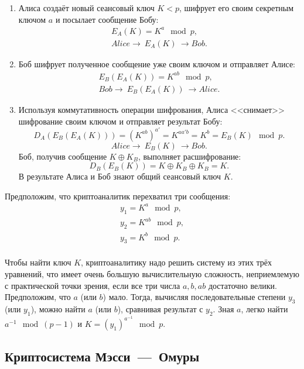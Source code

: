 \begin{enumerate}
    \item Алиса создаёт новый сеансовый ключ $K < p$, шифрует его своим секретным ключом $a$ и посылает сообщение Бобу:
            \[\begin{array}{l}
		E_A(K) = K ^ a \mod p, \\
		Alice \rightarrow ~ E_A(K) ~ \rightarrow Bob.
	    \end{array}\]
    \item Боб шифрует полученное сообщение уже своим ключом и отправляет Алисе:
            \[\begin{array}{l}
		E_B(E_A(K)) = K^{ab} \mod p, \\
		Bob \rightarrow ~ E_B(E_A(K)) ~ \rightarrow Alice.
	    \end{array}\]
    \item Используя коммутативность операции шифрования, Алиса <<снимает>> шифрование своим ключом и отправляет результат Бобу:
            \[ D_A \left( E_B \left( E_A \left( K \right) \right) \right) = \left( K^{ab} \right) ^{a'} = K^{aa'b} = K^{b} = E_B \left( K \right) \mod p. \]
            \[ Alice \rightarrow ~ E_B \left( K \right) ~ \rightarrow Bob. \]
    Боб, получив сообщение $K \oplus K_B$, выполняет расшифрование:
            \[ D_B( E_B( K ) ) = K \oplus K_B \oplus K_B = K. \]
    В результате Алиса и Боб знают общий сеансовый ключ $K$.
\end{enumerate}

Предположим, что криптоаналитик перехватил три сообщения:
\[ \begin{array}{l}
    y_1 = K^a \mod p, \\
    y_2 = K^{ab} \mod p, \\
    y_3 = K^b \mod p. \\
\end{array} \]

Чтобы найти ключ $K$, криптоаналитику надо решить систему из этих трёх уравнений, что имеет очень большую вычислительную сложность, неприемлемую с практической точки зрения, если все три числа $a, b, ab$ достаточно велики. Предположим, что $a$ (или $b$) мало. Тогда, вычисляя последовательные степени $y_3$ (или $y_1$), можно найти $a$ (или $b$), сравнивая результат с $y_2$. Зная $a$, легко найти $a^{-1}\mod(p-1)$ и $K=(y_1)^{a^{-1}}\mod p$.


\subsection{Криптосистема Мэсси~---~Омуры}

